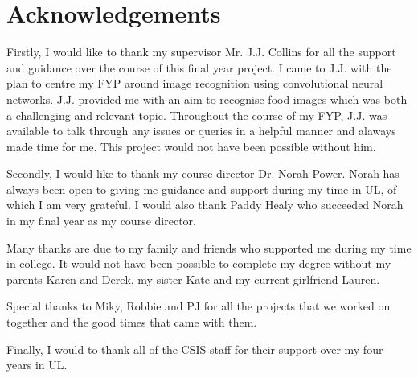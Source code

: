 \section*{Acknowledgements}
Firstly, I would like to thank my supervisor Mr. J.J. Collins for all the support and guidance over the course of this final year project.
I came to J.J. with the plan to centre my FYP around image recognition using convolutional neural networks.
J.J. provided me with an aim to recognise food images which was both a challenging and relevant topic.
Throughout the course of my FYP, J.J. was available to talk through any issues or queries in a helpful manner and alaways made time for me.
This project would not have been possible without him.

Secondly, I would like to thank my course director Dr. Norah Power.
Norah has always been open to giving me guidance and support during my time in UL, of which I am very grateful.
I would also thank Paddy Healy who succeeded Norah in my final year as my course director.

Many thanks are due to my family and friends who supported me during my time in college.
It would not have been possible to complete my degree without my parents Karen and Derek, my sister Kate and my current girlfriend Lauren.

Special thanks to Miky, Robbie and PJ for all the projects that we worked on together and the good times that came with them.

Finally, I would to thank all of the CSIS staff for their support over my four years in UL.